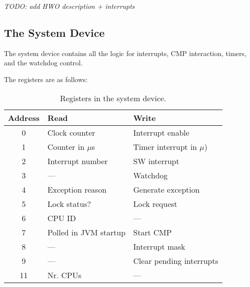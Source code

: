 
\emph{TODO: add HWO description + interrupts}

\subsection{The System Device}

The system device contains all the logic for interrupts, CMP
interaction, timers, and the watchdog control.

The registers are as follows:

\begin{table}
    \centering
    \begin{tabular}{cll}
        \toprule
        Address  & Read & Write \\
        \midrule
        0 & Clock counter & Interrupt enable \\
        1 & Counter in $\mu$s & Timer interrupt in $\mu$) \\
        2 & Interrupt number & SW interrupt \\
        3 & --- & Watchdog \\
        4 & Exception reason & Generate exception \\
        5 & Lock status? & Lock request \\
        6 & CPU ID & --- \\
        7 & Polled in JVM startup & Start CMP \\
        8 & --- & Interrupt mask \\
        9 & --- & Clear pending interrupts \\
        11 & Nr. CPUs & --- \\
        \bottomrule
    \end{tabular}
    \caption{Registers in the system device.}
    \label{tab:io:sysdev}
\end{table}
